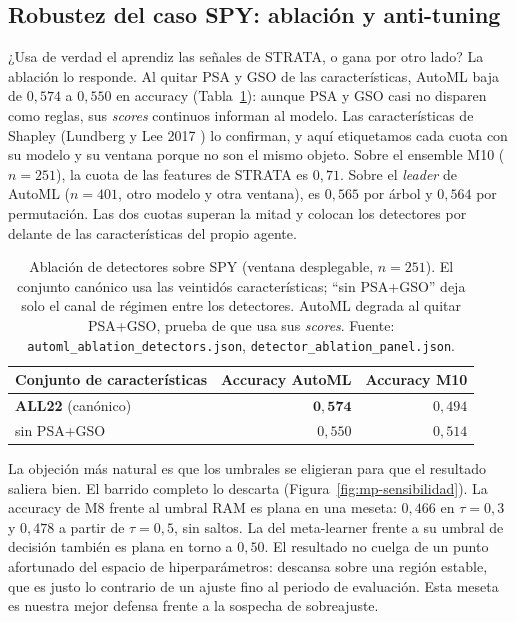 \subsection{Robustez del caso SPY: ablación y anti-tuning}
\label{sec:mp-spy-robustez}

¿Usa de verdad el aprendiz las señales de STRATA, o gana por otro lado? La ablación lo responde. Al quitar PSA y GSO de las características, AutoML baja de $0{,}574$ a $0{,}550$ en accuracy (Tabla~\ref{tab:mp-ablacion}): aunque PSA y GSO casi no disparen como reglas, sus \emph{scores} continuos informan al modelo. Las características de Shapley (Lundberg y Lee 2017 \cite{lundberg2017}) lo confirman, y aquí etiquetamos cada cuota con su modelo y su ventana porque no son el mismo objeto. Sobre el ensemble M10 ($n = 251$), la cuota de las features de STRATA es $0{,}71$. Sobre el \emph{leader} de AutoML ($n = 401$, otro modelo y otra ventana), es $0{,}565$ por árbol y $0{,}564$ por permutación. Las dos cuotas superan la mitad y colocan los detectores por delante de las características del propio agente.

\begin{table}[htbp]
\centering
\caption{Ablación de detectores sobre SPY (ventana desplegable, $n = 251$). El conjunto canónico usa las veintidós características; ``sin PSA+GSO'' deja solo el canal de régimen entre los detectores. AutoML degrada al quitar PSA+GSO, prueba de que usa sus \emph{scores}. Fuente: \texttt{automl\_ablation\_detectors.json}, \texttt{detector\_ablation\_panel.json}.}
\label{tab:mp-ablacion}
\begin{tabular}{lrr}
\toprule
Conjunto de características & Accuracy AutoML & Accuracy M10 \\
\midrule
\textbf{ALL22} (canónico) & $\mathbf{0{,}574}$ & $0{,}494$ \\
sin PSA+GSO & $0{,}550$ & $0{,}514$ \\
\bottomrule
\end{tabular}
\end{table}

La objeción más natural es que los umbrales se eligieran para que el resultado saliera bien. El barrido completo lo descarta (Figura~\ref{fig:mp-sensibilidad}). La accuracy de M8 frente al umbral RAM es plana en una meseta: $0{,}466$ en $\tau = 0{,}3$ y $0{,}478$ a partir de $\tau = 0{,}5$, sin saltos. La del meta-learner frente a su umbral de decisión también es plana en torno a $0{,}50$. El resultado no cuelga de un punto afortunado del espacio de hiperparámetros: descansa sobre una región estable, que es justo lo contrario de un ajuste fino al periodo de evaluación. Esta meseta es nuestra mejor defensa frente a la sospecha de sobreajuste.

